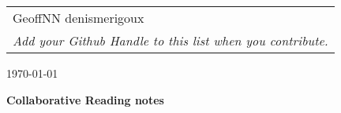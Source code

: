 \documentclass[12pt]{article}
\begin{document}
{\parindent 0pt
\begin{tabular}[t]{l}
GeoffNN
denismerigoux
\\ \textit{Add your Github Handle to this list when you contribute.}
\end{tabular}  \hfill \today \vskip 0.2in }

\parindent 0pt
\parskip 8pt

\begin{center}
\large\bf Collaborative Reading notes
\end{center}

\bigskip






\end{document}

